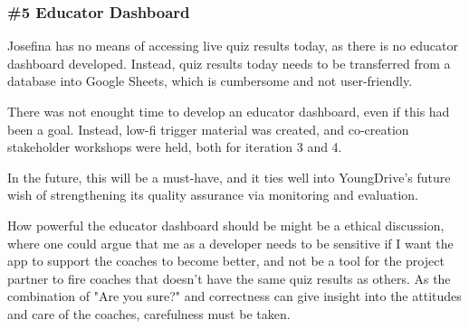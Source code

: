 \subsubsection{\#5 Educator Dashboard}
Josefina has no means of accessing live quiz results today, as there is no educator dashboard developed. Instead, quiz results today needs to be transferred from a database into Google Sheets, which is cumbersome and not user-friendly.

There was not enought time to develop an educator dashboard, even if this had been a goal. Instead, low-fi trigger material was created, and co-creation stakeholder workshops were held, both for iteration 3 and 4.

In the future, this will be a must-have, and it ties well into YoungDrive's future wish of strengthening its quality assurance via monitoring and evaluation.

How powerful the educator dashboard should be might be a ethical discussion, where one could argue that me as a developer needs to be sensitive if I want the app to support the coaches to become better, and not be a tool for the project partner to fire coaches that doesn't have the same quiz results as others. As the combination of "Are you sure?" and correctness can give insight into the attitudes and care of the coaches, carefulness must be taken.


